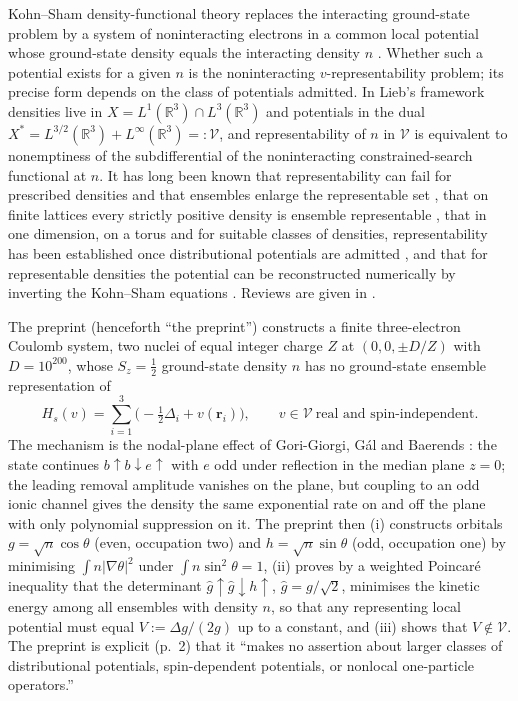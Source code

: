 \documentclass[11pt,a4paper]{article}
\theoremstyle{plain}
\theoremstyle{definition}
\theoremstyle{remark}
\newcommand{\R}{\mathbb{R}}
\newcommand{\VV}{\mathcal{V}}
\newcommand{\LL}{L^{3/2}(\R^3)+L^\infty(\R^3)}
\newcommand{\hg}{\hat g}
\begin{document}
Kohn--Sham density-functional theory replaces the interacting ground-state problem by a system of noninteracting electrons in a common local potential whose ground-state density equals the interacting density $n$ \cite{HK,KS}. Whether such a potential exists for a given $n$ is the noninteracting $v$-representability problem; its precise form depends on the class of potentials admitted. In Lieb's framework \cite{Lieb83} densities live in $X=L^1(\R^3)\cap L^3(\R^3)$ and potentials in the dual $X^*=\LL=:\VV$, and representability of $n$ in $\VV$ is equivalent to nonemptiness of the subdifferential of the noninteracting constrained-search functional at $n$. It has long been known that representability can fail for prescribed densities and that ensembles enlarge the representable set \cite{Levy82,Lieb83,EE83,EE84}, that on finite lattices every strictly positive density is ensemble representable \cite{CCR}, that in one dimension, on a torus and for suitable classes of densities, representability has been established once distributional potentials are admitted \cite{Sutter24,Corso26}, and that for representable densities the potential can be reconstructed numerically by inverting the Kohn--Sham equations \cite{ZMP94,JW18}. Reviews are given in \cite{PenzReview1,PenzReview2,vanLeeuwen03}.

The preprint \cite{OpenAI} (henceforth ``the preprint'') constructs a finite three-electron Coulomb system, two nuclei of equal integer charge $Z$ at $(0,0,\pm D/Z)$ with $D=10^{200}$, whose $S_z=\tfrac12$ ground-state density $n$ has no ground-state ensemble representation of
\[
H_s(v)=\sum_{i=1}^3\Big(-\tfrac12\Delta_i+v(\mathbf r_i)\Big),\qquad v\in\VV\ \text{real and spin-independent}.
\]
The mechanism is the nodal-plane effect of Gori-Giorgi, G\'al and Baerends \cite{GGB16}: the state continues $b\!\uparrow b\!\downarrow e\!\uparrow$ with $e$ odd under reflection in the median plane $z=0$; the leading removal amplitude vanishes on the plane, but coupling to an odd ionic channel gives the density the same exponential rate on and off the plane with only polynomial suppression on it. The preprint then (i) constructs orbitals $g=\sqrt n\cos\theta$ (even, occupation two) and $h=\sqrt n\sin\theta$ (odd, occupation one) by minimising $\int n|\nabla\theta|^2$ under $\int n\sin^2\theta=1$, (ii) proves by a weighted Poincar\'e inequality that the determinant $\hg\!\uparrow\hg\!\downarrow h\!\uparrow$, $\hg=g/\sqrt2$, minimises the kinetic energy among all ensembles with density $n$, so that any representing local potential must equal $V:=\Delta g/(2g)$ up to a constant, and (iii) shows that $V\notin\VV$. The preprint is explicit (p.~2) that it ``makes no assertion about larger classes of distributional potentials, spin-dependent potentials, or nonlocal one-particle operators.''
\end{document}
